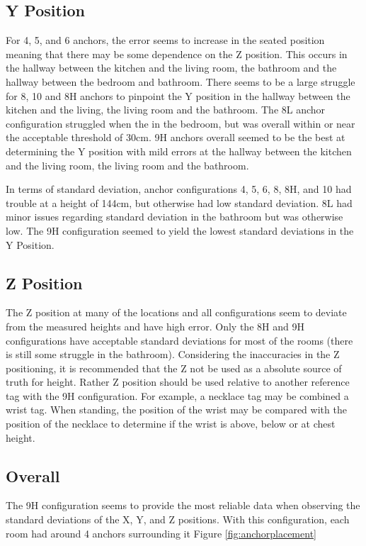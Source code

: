 \subsection{Y Position}
For 4, 5, and 6 anchors, the error seems to increase in the seated position
meaning that there may be some dependence on the Z position. This occurs 
in the hallway between the kitchen and the living room, the bathroom and the 
hallway between the bedroom and bathroom.
There seems to be a large struggle for 8, 10 and 8H anchors to pinpoint the Y
position in the hallway between the kitchen and the living, the living room
and the bathroom. The 8L anchor configuration struggled when the in the bedroom,
but was overall within or near the acceptable threshold of 30cm. 9H anchors
overall seemed to be the best at determining the Y position with mild 
errors at the hallway between the kitchen and the living room, the living room 
and the bathroom.

In terms of standard deviation, anchor configurations 4, 5, 6, 8, 8H, and 10 
had trouble at a height of 144cm, but otherwise had low standard deviation.
8L had minor issues regarding standard deviation in the bathroom 
but was otherwise low. The 9H configuration seemed to yield
the lowest standard deviations in the Y Position. 

\subsection{Z Position}
The Z position at many of the locations and all configurations seem 
to deviate from the measured heights and have high error. 
Only the 8H and 9H configurations have acceptable standard deviations
for most of the rooms (there is still some struggle in the bathroom).
Considering the inaccuracies in the Z positioning, it is recommended
that the Z not be used as a absolute source of truth for height. 
Rather Z position should be used relative to another reference tag 
with the 9H configuration. For example, a necklace tag may be combined
a wrist tag. When standing, the position of the wrist may be compared 
with the position of the necklace to determine if the wrist is 
above, below or at chest height.

\subsection{Overall}
The 9H configuration seems to provide the most reliable data when observing
the standard deviations of the X, Y, and Z positions. With this configuration,
each room had around 4 anchors surrounding it Figure \ref{fig:anchorplacement}

